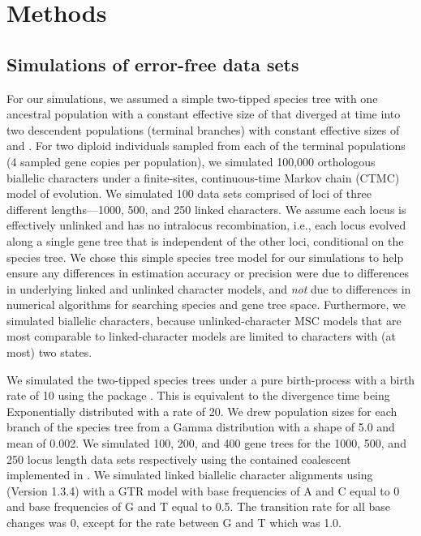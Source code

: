 \section{Methods}

\subsection{Simulations of error-free data sets}
For our simulations, we assumed a simple two-tipped species tree
with one ancestral population with a constant effective size
of
\rootpopsize
that diverged at time \divtime into
two descendent populations (terminal branches) with constant
effective sizes of
\tippopsize[1]
and
\tippopsize[2]
.
For two diploid individuals sampled from each of the terminal
populations (4 sampled gene copies per population),
we simulated 100,000 orthologous biallelic characters under a finite-sites,
continuous-time Markov chain (CTMC) model of evolution.
We simulated 100 data sets comprised of loci of three different lengths---1000,
500, and 250 linked characters.
We assume each locus is effectively unlinked and has no intralocus
recombination, i.e., each locus evolved along a single gene tree that is
independent of the other loci, conditional on the species tree.
We chose this simple species tree model for our simulations to help ensure any
differences in estimation accuracy or precision were due to differences in
underlying linked and unlinked character models,
and \emph{not} due to differences in numerical algorithms for searching species
and gene tree space.
Furthermore, we simulated biallelic characters, because unlinked-character MSC
models
\citep{bryantInferringSpeciesTrees2012,Oaks2018ecoevolity}
that are most comparable to linked-character models
\citep{Heled2010,ogilvieStarBEAST2BringsFaster2017}
are limited to characters with (at most) two states.

We simulated the two-tipped species trees under a pure birth-process with a
birth rate of 10 using the \python package
\dendropy
\citep[Version 4.40;  branch commit eb69003;][]{Dendropy}.  
This is equivalent to the divergence time being Exponentially distributed with
a rate of 20.
We drew population sizes for each branch of the species tree from a Gamma 
distribution with a shape of 5.0 and mean of 0.002. We simulated 100, 200, and 
400 gene trees for the 1000, 500, and 250 locus length data sets respectively 
using the contained coalescent implemented in \dendropy.
We simulated linked biallelic character alignments using
\seqgen (Version 1.3.4)
\citep{rambautSeqGenApplicationMonte1997}
with a GTR model with base frequencies of A and C equal to 0 and base 
frequencies of G and T equal to 0.5. The transition rate for all base changes was 
0, except for the rate between G and T which was 1.0. 

